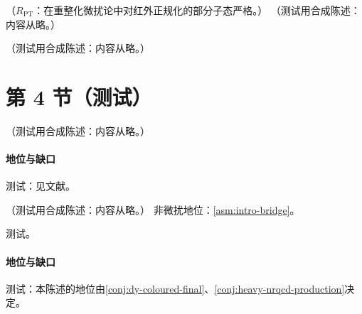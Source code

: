 \begin{proposition}\label{prop:heavy-nrqcd-matching}
（$R_{\mathrm{PT}}$：在重整化微扰论中对红外正规化的部分子态严格。）
（测试用合成陈述：内容从略。）
\end{proposition}

\begin{example}[阈值处的单圈 $c_v$]\label{ex:heavy-cv}
（测试用合成陈述：内容从略。）
\end{example}

\section{第 4 节（测试）}\label{sec:heavy-nrqcd}

\begin{conjecture}\label{conj:heavy-nrqcd-production}
（测试用合成陈述：内容从略。）
\end{conjecture}
\paragraph{地位与缺口}测试：见文献。

\begin{proposition}\label{prop:heavy-quarkonium-fragmentation}
（测试用合成陈述：内容从略。）
非微扰地位：\cref{asm:intro-bridge}。
\end{proposition}
\begin{proofsketch}测试。\end{proofsketch}
\paragraph{地位与缺口}测试：本陈述的地位由\cref{conj:dy-coloured-final}、\cref{conj:heavy-nrqcd-production}决定。
